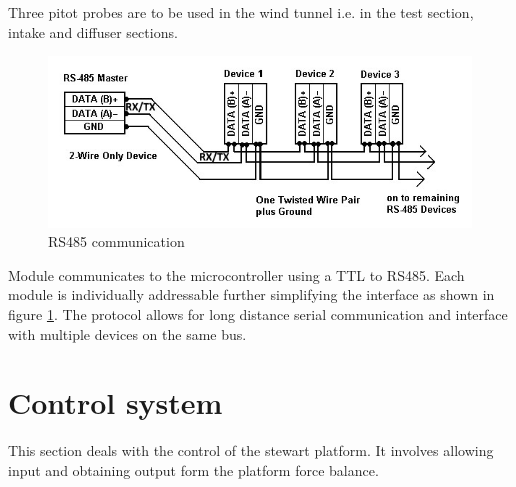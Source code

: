 Three pitot probes are to be used in the wind tunnel i.e. in the test section, intake and diffuser sections.
                                                                                                                                                                   
\begin{center}
\begin{figure}[H]
\centering
\includegraphics{Figures/modbus}
\caption[RS485 communication]{RS485 communication}
\label{fig:rs485}
\end{figure}
\end{center}
Module communicates to the microcontroller using a TTL to RS485. Each module is individually addressable further simplifying the interface as shown in figure \ref{fig:rs485}. 
The protocol allows for long distance serial communication and interface with multiple devices on the same bus.

\section{Control system}
This section deals with the control of the stewart platform. It involves allowing input and obtaining output form the platform force balance.
